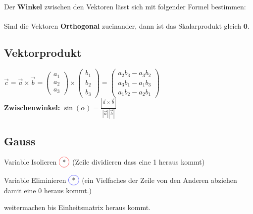 Der \textbf{Winkel} zwischen den Vektoren lässt sich mit folgender Formel bestimmen:\\
\\[5pt]
Sind die Vektoren \textbf{Orthogonal} zueinander, dann ist das Skalarprodukt gleich $\mathbf{0}$.


\subsection{Vektorprodukt}

$\vec{c}=\vec{a} \times \vec{b}=\left(\begin{array}{c}a_{1} \\ a_{2} \\ a_{3}\end{array}\right) \times\left(\begin{array}{c}b_{1} \\ b_{2} \\ b_{3}\end{array}\right)=\left(\begin{array}{c}a_{2} b_{3}-a_{3} b_{2} \\ a_{3} b_{1}-a_{1} b_{3} \\ a_{1} b_{2}-a_{2} b_{1}\end{array}\right)$\\[5pt]

\textbf{Zwischenwinkel:} \qquad $\sin(\alpha)=\frac{|\vec{a} \times \vec{b}|}{|\vec{a}||\vec{b}|}$

\subsection{Gauss}
\begin{compactenum}
	\item Variable Isolieren $\circledr{*}$ (Zeile dividieren dass eine 1 heraus kommt)
	\item Variable Eliminieren $\circledb{*}$ (ein Vielfaches der Zeile von den Anderen abziehen damit eine 0 heraus kommt.)
	\item weitermachen bis Einheitsmatrix heraus kommt.
\end{compactenum}

